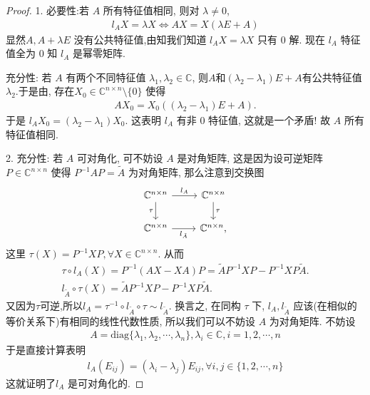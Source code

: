 \documentclass[../../main.tex]{subfiles}%
\begin{document}
\begin{proof}

1. {\heiti 必要性:}若 $A$ 所有特征值相同, 则对 $\lambda \neq 0$,
\begin{align*}
l_A X = \lambda X \Leftrightarrow AX = X(\lambda E + A)
\end{align*}
显然$A, A + \lambda E$ 没有公共特征值,由知我们知道 $l_A X = \lambda X$ 只有 $0$ 解. 现在 $l_A$ 特征值全为 $0$ 知 $l_A$ 是幂零矩阵.

{\heiti 充分性:} 若 $A$ 有两个不同特征值 $\lambda_1, \lambda_2 \in \mathbb{C}$, 则$A$和$(\lambda_2-\lambda_1)E+A$有公共特征值$\lambda_2$.于是由, 存在$X_0 \in \mathbb{C}^{n \times n} \setminus \{0\}$ 使得
\begin{align*}
A X_0 = X_0((\lambda_2 - \lambda_1)E + A).
\end{align*}
于是 $l_A X_0 = (\lambda_2 - \lambda_1) X_0$. 这表明 $l_A$ 有非 $0$ 特征值, 这就是一个矛盾! 故 $A$ 所有特征值相同.

2. {\heiti 充分性:} 若 $A$ 可对角化, 可不妨设 $A$ 是对角矩阵, 这是因为设可逆矩阵 $P \in \mathbb{C}^{n \times n}$ 使得 $P^{-1} A P = \tilde{A}$ 为对角矩阵, 那么注意到交换图
\[
\begin{tikzcd}
\mathbb{C}^{n\times n} \arrow[d, "\tau"'] \arrow[r, "l_A"] & \mathbb{C}^{n\times n} \arrow[d, "\tau"] \\
\mathbb{C}^{n\times n} \arrow[r, "l_{\tilde{A}}"']                   & \mathbb{C}^{n\times n},                  
\end{tikzcd}
\]
这里 $\tau(X) = P^{-1} X P, \forall X \in \mathbb{C}^{n \times n}$. 从而
\begin{gather*}
\tau \circ l_A\left( X \right) =P^{-1}\left( AX-XA \right) P=\widetilde{A}P^{-1}XP-P^{-1}XP\widetilde{A}.
\\
l_{\widetilde{A}}\circ \tau \left( X \right) =\widetilde{A}P^{-1}XP-P^{-1}XP\widetilde{A}.
\end{gather*}
又因为$\tau$可逆,所以$l_A=\tau ^{-1} \circ l_{\tilde{A}}\circ \tau \sim l_{\tilde{A}}.$
换言之, 在同构 $\tau$ 下, $l_A, l_{\tilde{A}}$ 应该(在相似的等价关系下)有相同的线性代数性质, 所以我们可以不妨设 $A$ 为对角矩阵.
不妨设
\begin{align*}
A = \mathrm{diag}\{\lambda_1, \lambda_2, \cdots, \lambda_n\}, \lambda_i \in \mathbb{C}, i = 1, 2, \cdots, n 
\end{align*}
于是直接计算表明
\begin{align*}
l_A(E_{ij}) = (\lambda_i - \lambda_j) E_{ij}, \forall i, j \in \{1, 2, \cdots, n\}
\end{align*}
这就证明了$l_A$ 是可对角化的.


\end{proof}
\end{document}

